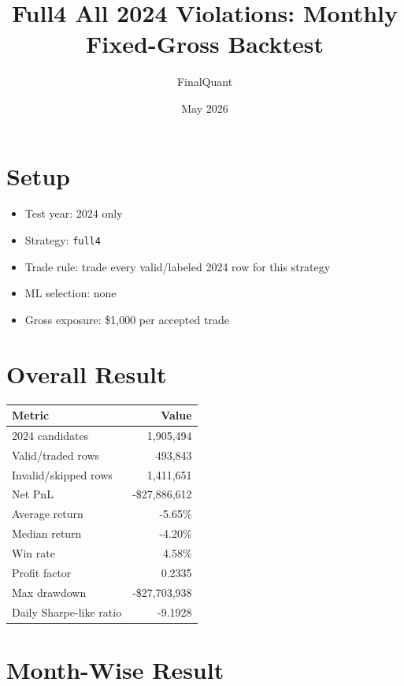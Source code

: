 \documentclass[11pt]{article}
\title{Full4 All 2024 Violations: Monthly Fixed-Gross Backtest}
\author{FinalQuant}
\date{May 2026}
\begin{document}
\maketitle

\section{Setup}

\begin{itemize}
  \item Test year: 2024 only
  \item Strategy: \texttt{full4}
  \item Trade rule: trade every valid/labeled 2024 row for this strategy
  \item ML selection: none
  \item Gross exposure: \$1,000 per accepted trade
\end{itemize}

\section{Overall Result}

\begin{center}
\begin{tabular}{@{}lr@{}}
\toprule
Metric & Value \\
\midrule
2024 candidates & 1,905,494 \\
Valid/traded rows & 493,843 \\
Invalid/skipped rows & 1,411,651 \\
Net PnL & -\$27,886,612 \\
Average return & -5.65\% \\
Median return & -4.20\% \\
Win rate & 4.58\% \\
Profit factor & 0.2335 \\
Max drawdown & -\$27,703,938 \\
Daily Sharpe-like ratio & -9.1928 \\
\bottomrule
\end{tabular}
\end{center}

\section{Month-Wise Result}
\end{document}
